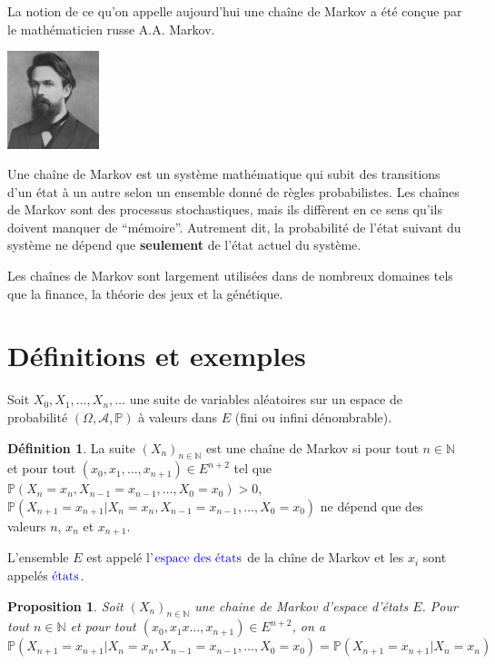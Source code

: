 \documentclass[
]{book}
\newtheorem{proposition}{Proposition}[chapter]
\theoremstyle{definition}
\newtheorem{definition}{Définition}[chapter]
\theoremstyle{definition}
\theoremstyle{definition}
\theoremstyle{remark}
\begin{document}
La notion de ce qu'on appelle aujourd'hui une chaîne de Markov a été conçue par le mathématicien russe A.A. Markov.

\includegraphics[width=0.2\textwidth,height=0.2\textheight]{Markov.jpg}

Une chaîne de Markov est un système mathématique qui subit des transitions d'un état à un autre selon un ensemble donné de règles probabilistes. Les chaînes de Markov sont des processus stochastiques, mais ils diffèrent en ce sens qu'ils doivent manquer de ``mémoire''. Autrement dit, la probabilité de l'état suivant du système ne dépend que \textbf{seulement} de l'état actuel du système.

Les chaînes de Markov sont largement utilisées dans de nombreux domaines tels que la finance, la théorie des jeux et la génétique.

\hypertarget{duxe9finitions-et-exemples}{%
\section{Définitions et exemples}\label{duxe9finitions-et-exemples}}

Soit \(X_0, X_1,\ldots, X_n, \ldots\) une suite de variables aléatoires sur un espace de probabilité \((\Omega,\mathcal{A}, \mathbb{P})\) à valeurs dans \(E\) (fini ou infini dénombrable).

\begin{definition}
\protect\hypertarget{def:unnamed-chunk-36}{}{\label{def:unnamed-chunk-36} }La suite \((X_n)_{n \in \mathbb{N}}\) est une chaîne de Markov si pour tout \(n \in \mathbb{N}\) et pour tout \((x_0,x_1, \ldots,x_{n+1}) \in E^{n+2}\) tel que \(\mathbb{P}(X_n=x_n, X_{n-1}=x_{n-1},\ldots, X_0=x_0) >0\), \(\mathbb{P}(X_{n+1}=x_{n+1}|X_n=x_n,X_{n-1}=x_{n-1},\ldots, X_0=x_0)\) ne dépend que des valeurs \(n\), \(x_n\) et \(x_{n+1}\).
\end{definition}
L'ensemble \(E\) est appelé l'\(\color{blue}{\mathbf{\text{espace des états}}}\) de la chîne de Markov et les \(x_i\) sont appelés \(\color{blue}{\mathbf{\text{états}}}\).
\begin{proposition}
\protect\hypertarget{prp:unnamed-chunk-37}{}{\label{prp:unnamed-chunk-37} }Soit \((X_n)_{n \in \mathbb{N}}\) une chaine de Markov d'espace d'états \(E\). Pour tout \(n \in \mathbb{N}\) et pour tout \((x_0,x_1x\ldots,x_{n+1})\in E^{n+2}\), on a
\[\mathbb{P}(X_{n+1}=x_{n+1}|X_n=x_n,X_{n-1}=x_{n-1},\ldots, X_0=x_0)=\mathbb{P}(X_{n+1}=x_{n+1}|X_n=x_n)\]
\end{proposition}
\end{document}
